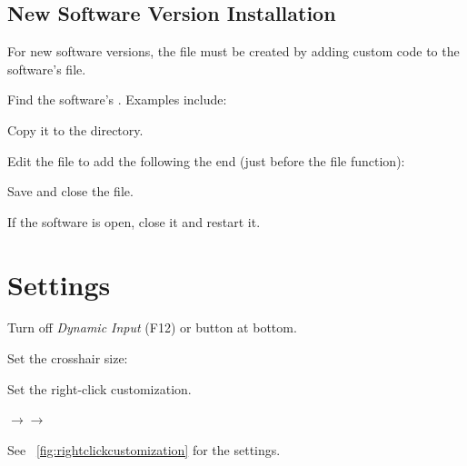 \subsection{New Software Version Installation}
For new software versions, the  file must be created by adding custom code to the software's  file.
\label{sec:lispinstallation}
\begin{numberedlist}
    \item Find the software's .  Examples include:
    \begin{bulletedlist}
    	\item {}
    	\item {}
    	\item {}
    \end{bulletedlist}
    \item Copy it to the \supportdir{} directory.
    \item Edit the file to add the following the end (just before the file  function):
    \begin{plainlist}
    	\item {}
		\item {}
    \end{plainlist}
    \item Save and close the file.
    \item If the software is open, close it and restart it.
\end{numberedlist}


\section{Settings}
\begin{bulletedlist}
	\item Turn off \textit{Dynamic Input} (F12) or button at bottom.
	\item Set the crosshair size: 
	\item Set the right-click customization.
	\begin{numberedlist}
		\item {}$\rightarrow$$\rightarrow$
		\item See \figurename~\ref{fig:rightclickcustomization} for the settings.
	\end{numberedlist}
\end{bulletedlist}

